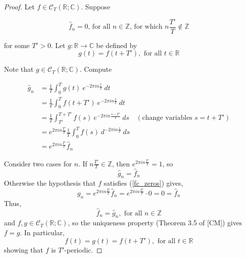 \documentclass[12pt, reqno]{article}
\theoremstyle{definition}
\theoremstyle{remark}
\begin{document}
\begin{proof}
    Let $f\in\mathcal{C}_{T}(\mathbb{R};\mathbb{C})$. Suppose 
    
    \[
        \hat f_{n}=0\text{, for all }n\in\mathbb{Z}\text{, for which }n \frac{T'}{T}\notin\mathbb{Z}
    \]

    for some $T'>0$. Let $g:\mathbb{R}\rightarrow \mathbb{C}$ be defined by 
    \[
        g(t)=f(t+T'),\text{ for all }t\in \mathbb{R}
    \]    

    Note that $g\in\mathcal{C}_{T}(\mathbb{R};\mathbb{C})$. Compute 
    
    \begin{align*}
        \hat g_{n}&= \frac{1}{T}\int_{0}^{T}g(t)\ e^{-2\pi in \frac{t}{T}}\ dt\\
        &= \frac{1}{T}\int_{0}^{T}f(t+T')\ e^{-2\pi in \frac{t}{T}}\ dt\\
        &= \frac{1}{T}\int_{T'}^{T+T'}f(s)\ e^{-2\pi in \frac{s-T'}{T}}\ ds\quad(\text{change variables }s=t+T')\\
        &= e^{2\pi in \frac{T'}{T}} \frac{1}{T}\int_{0}^{T}f(s)\ d^{-2\pi in \frac{s}{T}}\ ds\\
        &= e^{2\pi in \frac{T'}{T}}\hat f_{n}
    \end{align*}
    
    Consider two cases for $n$. If $n \frac{T'}{T}\in\mathbb{Z}$, then $e^{2\pi in \frac{T'}{T}}=1$, so 
    \[
        \hat g_{n}=\hat f_{n}
    \] 
    Otherwise the hypothesis that $f$ satisfies (\ref{fc_zeros}) gives, 
    \[
        g_{n}=e^{2\pi in \frac{T'}{T}}\hat f_{n}=e^{2\pi in \frac{T'}{T}}\cdot0=0=\hat f_{n}
    \] 
    Thus, 
    \[
        \hat f_{n}=\hat g_{n},\text{ for all }n\in\mathbb Z
    \] 
    and $f,g\in\mathcal{C}_{T}(\mathbb{R};\mathbb{C})$, so the uniqueness property (Theorem 3.5 of [CM]) gives $f=g$. In particular, 
    \[ 
        f(t)=g(t)=f(t+T'),\text{ for all }t\in \mathbb{R}
    \] 
    showing that $f$ is $T'$-periodic.
\end{proof}


\vspace{0.2 cm}
\end{document}
